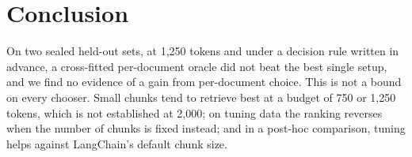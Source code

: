 \section{Conclusion}\label{sec:conclusion}

On two sealed held-out sets, at 1,250 tokens and under a decision rule written in
advance, a cross-fitted per-document oracle did not beat the best single setup,
and we find no evidence of a gain from per-document choice. This is not a bound
on every chooser. Small chunks tend to retrieve best at a budget of 750 or 1,250
tokens, which is not established at 2,000; on tuning data the ranking reverses
when the number of chunks is fixed instead; and in a post-hoc comparison, tuning
helps against LangChain's default chunk size.

